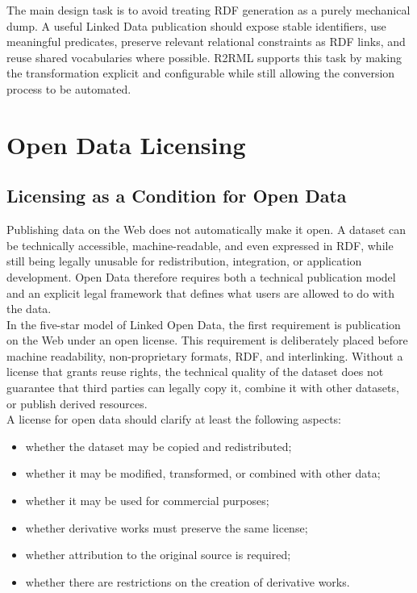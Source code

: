 \documentclass{scrbook}
\begin{document}
	The main design task is to avoid treating RDF generation as a purely mechanical dump. A useful Linked Data publication should expose stable identifiers, use meaningful predicates, preserve relevant relational constraints as RDF links, and reuse shared vocabularies where possible. R2RML supports this task by making the transformation explicit and configurable while still allowing the conversion process to be automated.
	
	\chapter{Open Data Licensing}
	
	\section{Licensing as a Condition for Open Data}
	
	Publishing data on the Web does not automatically make it open. A dataset can be technically accessible, machine-readable, and even expressed in RDF, while still being legally unusable for redistribution, integration, or application development. Open Data therefore requires both a technical publication model and an explicit legal framework that defines what users are allowed to do with the data.\\
	
	In the five-star model of Linked Open Data, the first requirement is publication on the Web under an open license. This requirement is deliberately placed before machine readability, non-proprietary formats, RDF, and interlinking. Without a license that grants reuse rights, the technical quality of the dataset does not guarantee that third parties can legally copy it, combine it with other datasets, or publish derived resources.\\
	
	A license for open data should clarify at least the following aspects:
	
	\begin{itemize}
	    \item whether the dataset may be copied and redistributed;
	    \item whether it may be modified, transformed, or combined with other data;
	    \item whether it may be used for commercial purposes;
	    \item whether derivative works must preserve the same license;
	    \item whether attribution to the original source is required;
	    \item whether there are restrictions on the creation of derivative works.
	\end{itemize}
	
\end{document}
